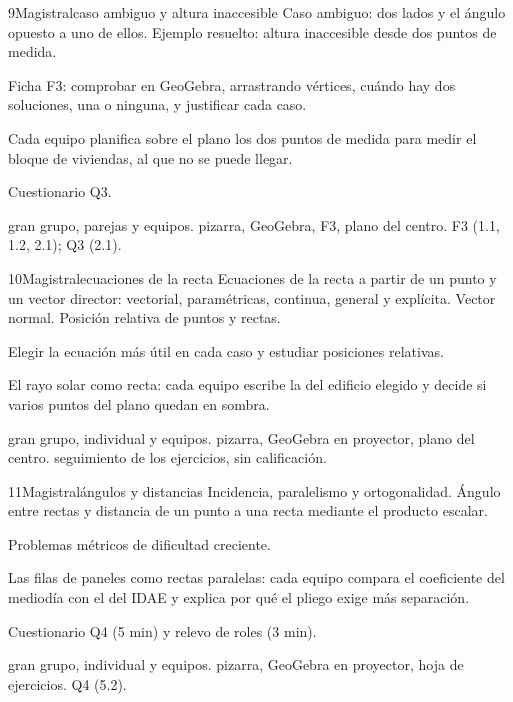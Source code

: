 \begin{sesionbox}{9}{Magistral}{caso ambiguo y altura inaccesible}
 Caso ambiguo: dos lados y el ángulo opuesto a uno de ellos. Ejemplo resuelto: altura inaccesible desde dos puntos de medida.

 Ficha F3: comprobar en GeoGebra, arrastrando vértices, cuándo hay dos soluciones, una o ninguna, y justificar cada caso.

 Cada equipo planifica sobre el plano los dos puntos de medida para medir el bloque de viviendas, al que no se puede llegar.

 Cuestionario Q3.

 gran grupo, parejas y equipos.  pizarra, GeoGebra, F3, plano del centro.  F3 (1.1, 1.2, 2.1); Q3 (2.1).
\end{sesionbox}

\begin{sesionbox}{10}{Magistral}{ecuaciones de la recta}
 Ecuaciones de la recta a partir de un punto y un vector director: vectorial, paramétricas, continua, general y explícita. Vector normal. Posición relativa de puntos y rectas.

 Elegir la ecuación más útil en cada caso y estudiar posiciones relativas.

 El rayo solar como recta: cada equipo escribe la del edificio elegido y decide si varios puntos del plano quedan en sombra.

 gran grupo, individual y equipos.  pizarra, GeoGebra en proyector, plano del centro.  seguimiento de los ejercicios, sin calificación.
\end{sesionbox}

\begin{sesionbox}{11}{Magistral}{ángulos y distancias}
 Incidencia, paralelismo y ortogonalidad. Ángulo entre rectas y distancia de un punto a una recta mediante el producto escalar.

 Problemas métricos de dificultad creciente.

 Las filas de paneles como rectas paralelas: cada equipo compara el coeficiente del mediodía con el del IDAE y explica por qué el pliego exige más separación.

 Cuestionario Q4 (5 min) y relevo de roles (3 min).

 gran grupo, individual y equipos.  pizarra, GeoGebra en proyector, hoja de ejercicios.  Q4 (5.2).
\end{sesionbox}

